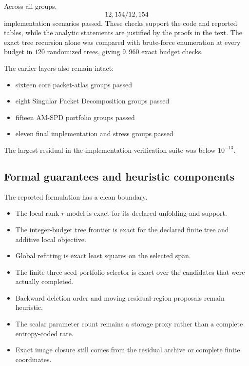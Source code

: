\documentclass[11pt]{article}
\theoremstyle{definition}
\theoremstyle{remark}
\begin{document}
Across all groups,
\[
\boxed{12{,}154/12{,}154}
\]
implementation scenarios passed. These checks support the code and reported tables, while the analytic statements are justified by the proofs in the text. The exact tree recursion alone was compared with brute-force enumeration at every budget in $120$ randomized trees, giving $9{,}960$ exact budget checks.

The earlier layers also remain intact:

\begin{itemize}
\item sixteen core packet-atlas groups passed
\item eight Singular Packet Decomposition groups passed
\item fifteen AM-SPD portfolio groups passed
\item eleven final implementation and stress groups passed
\end{itemize}

The largest residual in the implementation verification suite was below $10^{-13}$.



\FloatBarrier
\subsection{Formal guarantees and heuristic components}
The reported formulation has a clean boundary.

\begin{itemize}
\item The local rank-$r$ model is exact for its declared unfolding and support.
\item The integer-budget tree frontier is exact for the declared finite tree and additive local objective.
\item Global refitting is exact least squares on the selected span.
\item The finite three-seed portfolio selector is exact over the candidates that were actually completed.
\item Backward deletion order and moving residual-region proposals remain heuristic.
\item The scalar parameter count remains a storage proxy rather than a complete entropy-coded rate.
\item Exact image closure still comes from the residual archive or complete finite coordinates.
\end{itemize}
\end{document}

